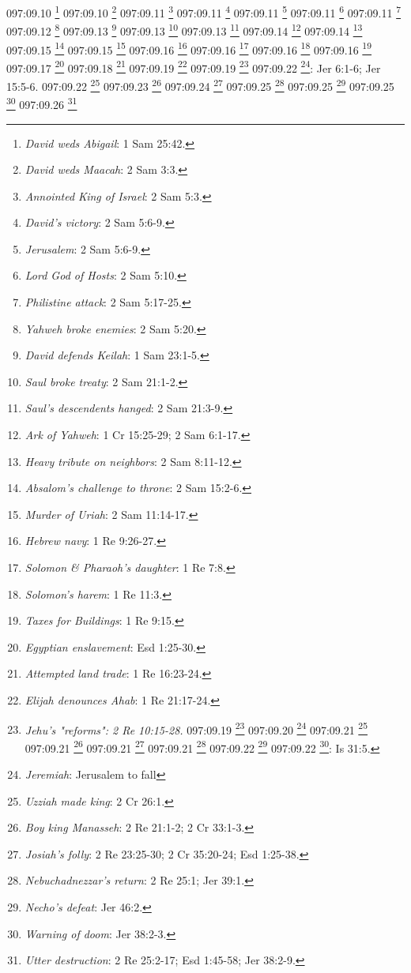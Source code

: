 {{{{{{{{{097:09.10 \footnote{\textit{David weds Abigail}: 1 Sam 25:42.}
097:09.10 \footnote{\textit{David weds Maacah}: 2 Sam 3:3.}
097:09.11 \footnote{\textit{Annointed King of Israel}: 2 Sam 5:3.}
097:09.11 \footnote{\textit{David's victory}: 2 Sam 5:6-9.}
097:09.11 \footnote{\textit{Jerusalem}: 2 Sam 5:6-9.}
097:09.11 \footnote{\textit{Lord God of Hosts}: 2 Sam 5:10.}
097:09.11 \footnote{\textit{Philistine attack}: 2 Sam 5:17-25.}
097:09.12 \footnote{\textit{Yahweh broke enemies}: 2 Sam 5:20.}
097:09.13 \footnote{\textit{David defends Keilah}: 1 Sam 23:1-5.}
097:09.13 \footnote{\textit{Saul broke treaty}: 2 Sam 21:1-2.}
097:09.13 \footnote{\textit{Saul's descendents hanged}: 2 Sam 21:3-9.}
097:09.14 \footnote{\textit{Ark of Yahweh}: 1 Cr 15:25-29; 2 Sam 6:1-17.}
097:09.14 \footnote{\textit{Heavy tribute on neighbors}: 2 Sam 8:11-12.}
097:09.15 \footnote{\textit{Absalom's challenge to throne}: 2 Sam 15:2-6.}
097:09.15 \footnote{\textit{Murder of Uriah}: 2 Sam 11:14-17.}
097:09.16 \footnote{\textit{Hebrew navy}: 1 Re 9:26-27.}
097:09.16 \footnote{\textit{Solomon & Pharaoh's daughter}: 1 Re 7:8.}
097:09.16 \footnote{\textit{Solomon's harem}: 1 Re 11:3.}
097:09.16 \footnote{\textit{Taxes for Buildings}: 1 Re 9:15.}
097:09.17 \footnote{\textit{Egyptian enslavement}: Esd 1:25-30.}
097:09.18 \footnote{\textit{Attempted land trade}: 1 Re 16:23-24.}
097:09.19 \footnote{\textit{Elijah denounces Ahab}: 1 Re 21:17-24.}
097:09.19 \footnote{\textit{Jehu's "reforms": 2 Re 10:15-28.}
097:09.19 \footnote{\textit{Naboth killed}: 1 Re 21:1-16.}
097:09.20 \footnote{\textit{Jehoash}: 2 Re 12:1-2.}
097:09.21 \footnote{\textit{Adding house to house}: Is 5:8.}
097:09.21 \footnote{\textit{End of kingdom}: 2 Re 17:4-6.}
097:09.21 \footnote{\textit{Remnant of Israel}: 2 Cr 34:9; Is 10:20; Jer 6:9; Ez 11:13; Miq 2:12; Sof 3:13.}
097:09.21 \footnote{\textit{Revolt by boy king Joash}: 2 Re 11:12,17-19; 2 Cr 23:11,16-20.}
097:09.22 \footnote{\textit{Amaziah slain}: 2 Cr 25:27.}
097:09.22 \footnote{\textit{Isaiah}: Jerusalem never fall}: Is 31:5.}
097:09.22 \footnote{\textit{Jeremiah}: Jerusalem to fall}: Jer 6:1-6; Jer 15:5-6.}
097:09.22 \footnote{\textit{Uzziah made king}: 2 Cr 26:1.}
097:09.23 \footnote{\textit{Boy king Manasseh}: 2 Re 21:1-2; 2 Cr 33:1-3.}
097:09.24 \footnote{\textit{Josiah's folly}: 2 Re 23:25-30; 2 Cr 35:20-24; Esd 1:25-38.}
097:09.25 \footnote{\textit{Nebuchadnezzar's return}: 2 Re 25:1; Jer 39:1.}
097:09.25 \footnote{\textit{Necho's defeat}: Jer 46:2.}
097:09.25 \footnote{\textit{Warning of doom}: Jer 38:2-3.}
097:09.26 \footnote{\textit{Utter destruction}: 2 Re 25:2-17; Esd 1:45-58; Jer 38:2-9.}
}}}}}}}}
